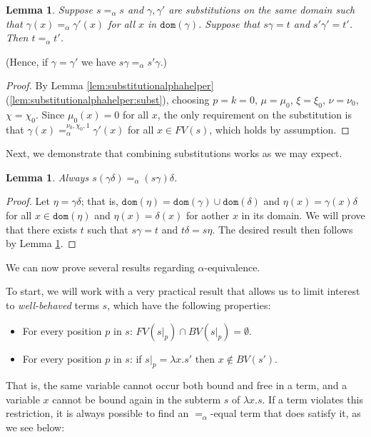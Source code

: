 \documentclass{lmcs}
\theoremstyle{theorem}\newtheorem{theorem}[dummy]{Theorem}
\theoremstyle{theorem}\newtheorem{lemma}[dummy]{Lemma}
\theoremstyle{theorem}\newtheorem{corollary}[dummy]{Corollary}
\theoremstyle{definition}\newtheorem{definition}[dummy]{Definition}
\theoremstyle{definition}\newtheorem{example}[dummy]{Example}
\newcommand{\FV}{\mathit{FV}}
\newcommand{\BV}{\mathit{BV}}
\newcommand{\domain}{\mathtt{dom}}
\newcommand{\avar}{x}
\newcommand{\abs}[2]{\lambda #1.#2}
\begin{document}
\begin{lemma}\label{lem:substitutionalpha}
Suppose $s =_\alpha s$ and $\gamma,\gamma'$ are substitutions on the same domain such that $\gamma(x) =_\alpha \gamma'(x)$ for all $x$ in $\domain(\gamma)$.
Suppose that $s\gamma = t$ and $s'\gamma' = t'$.
Then $t =_\alpha t'$.
\end{lemma}

(Hence, if $\gamma = \gamma'$ we have $s\gamma =_\alpha s'\gamma$.)

\begin{proof}
By Lemma \ref{lem:substitutionalphahelper}(\ref{lem:substitutionalphahelper:subst}), choosing
$p = k = 0$, $\mu = \mu_0$, $\xi = \xi_0$, $\nu = \nu_0$, $\chi = \chi_0$.
Since $\mu_0(x) = 0$ for all $x$, the only requirement on the substitution is that $\gamma(x)
=_\alpha^{\nu_0,\chi_0,1} \gamma'(x)$ for all $x \in \FV(s)$, which holds by assumption.
\end{proof}

Next, we demonstrate that combining substitutions works as we may expect.

\begin{lemma}\label{lem:combinesubst}
Always $s(\gamma\delta) =_\alpha (s\gamma)\delta$.
\end{lemma}

\begin{proof}
Let $\eta = \gamma\delta$; that is, $\domain(\eta) = \domain(\gamma) \cup \domain(\delta)$ and
$\eta(x) = \gamma(x)\delta$ for all $x \in \domain(\eta)$ and $\eta(x) = \delta(x)$ for aother $x$
in its domain.  We will prove that there exists $t$ such that $s\gamma = t$ and $t\delta = s\eta$.
The desired result then follows by Lemma \ref{lem:substitutionalpha}.
\end{proof}

We can now prove several results regarding $\alpha$-equivalence.

To start, we will work with a very practical result that allows us to limit interest to
\emph{well-behaved} terms $s$, which have the following properties:

\begin{itemize}
\item For every position $p$ in $s$: $\FV(s|_p) \cap \BV(s|_p) = \emptyset$.
\item For every position $p$ in $s$: if $s|_p = \abs{\avar}{s'}$ then $\avar \notin \BV(s')$.
\end{itemize}

That is, the same variable cannot occur both bound and free in a term, and a variable $\avar$
cannot be bound again in the subterm $s$ of $\abs{\avar}{s}$.  If a term violates this restriction,
it is always possible to find an $=_\alpha$-equal term that does satisfy it, as we see below:
\end{document}
